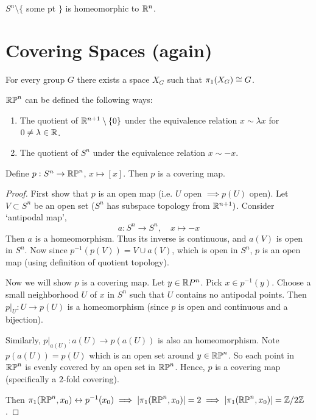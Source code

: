 \documentclass[12pt]{amsart}
\begin{document}
\begin{remark}
    $S^n \setminus \{$ some pt $\}$ is homeomorphic to $\mathbb R^n$. 
\end{remark}

\newpage 

\section{Covering Spaces (again)} 

\begin{remark}
    For every group $G$ there exists a space $X_G$ such that $\pi_1(X_G) \cong G$. 
\end{remark}

\begin{definition}
    $\mathbb{RP}^n$ can be defined the following ways: 
    \begin{enumerate}
        \item The quotient of $\mathbb R^{n+1} \setminus \{0\}$ under the equivalence relation $x \sim \lambda x$ for $0 \neq \lambda \in \mathbb R$.
        \item The quotient of $S^n$ under the equivalence relation $x \sim -x$. 
    \end{enumerate}
\end{definition}

\begin{theorem}
    Define $p: S^n \to \mathbb{RP}^n$, $x \mapsto [x]$. Then $p$ is a covering map. 
\end{theorem}

\begin{proof}
    First show that $p$ is an open map (i.e. $U$ open $\implies p(U)$ open). Let $V \subset S^n$ be an open set ($S^n$ has subspace topology  from $\mathbb R^{n+1})$. Consider `antipodal map', 
    \[a: S^n \to S^n, \quad x \mapsto -x\]
    Then $a$ is a homeomorphism. Thus its inverse is continuous, and $a(V)$ is open in $S^n$. Now since $p^{-1}(p(V)) = V \cup a(V)$, which is open in $S^n$, $p$ is an open map (using definition of quotient topology). 

    Now we will show $p$ is a covering map. Let $y \in \mathbb R P^n$. Pick $x \in p^{-1}(y)$. Choose a small neighborhood $U$ of $x$ in $S^n$ such that $U$ contains no antipodal points. Then $p|_U: U \to p(U)$ is a homeomorphism (since $p$ is open and continuous and a bijection).

    Similarly, $p|_{a(U)}: a(U) \to p(a(U))$ is also an homeomorphism. Note $p(a(U)) = p(U)$ which is an open set around $y \in \mathbb{RP}^n$. So each point in $\mathbb{RP}^n$ is evenly covered by an open set in $\mathbb{RP}^n$. Hence, $p$ is a covering map (specifically a $2$-fold covering). 

    Then $\pi_1(\mathbb{RP}^n, x_0) \leftrightarrow p^{-1}(x_0) \implies |\pi_1(\mathbb{RP}^n, x_0)| = 2 \implies  |\pi_1(\mathbb{RP}^n, x_0)| = \mathbb Z/2\mathbb Z $. 
\end{proof}
\end{document}

